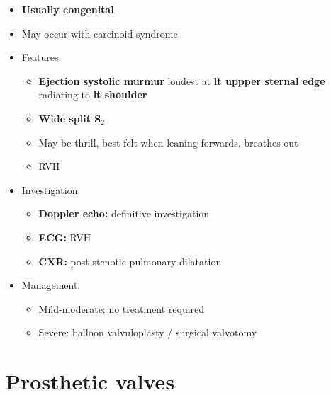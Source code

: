 \documentclass[
  12pt,
]{memoir}
\providecommand{\tightlist}{%
  \setlength{\itemsep}{0pt}\setlength{\parskip}{0pt}}
\begin{document}
\begin{itemize}
\tightlist
\item
  \textbf{Usually congenital}
\item
  May occur with carcinoid syndrome
\item
  Features:

  \begin{itemize}
  \tightlist
  \item
    \textbf{Ejection systolic murmur} loudest at \textbf{lt uppper
    sternal edge} radiating to \textbf{lt shoulder}
  \item
    \textbf{Wide split S\(_2\)}
  \item
    May be thrill, best felt when leaning forwards, breathes out
  \item
    RVH
  \end{itemize}
\item
  Investigation:

  \begin{itemize}
  \tightlist
  \item
    \textbf{Doppler echo:} definitive investigation
  \item
    \textbf{ECG:} RVH
  \item
    \textbf{CXR:} post-stenotic pulmonary dilatation
  \end{itemize}
\item
  Management:

  \begin{itemize}
  \tightlist
  \item
    Mild-moderate: no treatment required
  \item
    Severe: balloon valvuloplasty / surgical valvotomy
  \end{itemize}
\end{itemize}

\hypertarget{prosthetic-valves}{%
\section{Prosthetic valves}\label{prosthetic-valves}}
\end{document}
